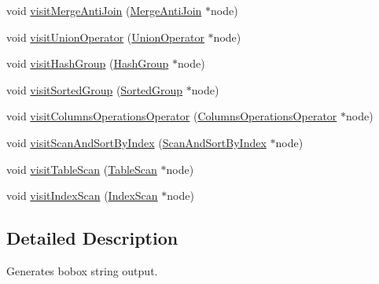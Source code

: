 \begin{DoxyCompactItemize}
\item 
void \hyperlink{class_bobox_plan_writing_physical_operator_visitor_a0346b44be20be9fb68d95029908808f6}{visit\+Merge\+Anti\+Join} (\hyperlink{class_merge_anti_join}{Merge\+Anti\+Join} $\ast$node)
\item 
void \hyperlink{class_bobox_plan_writing_physical_operator_visitor_a87c2ddbe5d05b7dcc30c9d61d540d1f5}{visit\+Union\+Operator} (\hyperlink{class_union_operator}{Union\+Operator} $\ast$node)
\item 
void \hyperlink{class_bobox_plan_writing_physical_operator_visitor_a1e114b9a6e5bf08a691a9197f03efe9d}{visit\+Hash\+Group} (\hyperlink{class_hash_group}{Hash\+Group} $\ast$node)
\item 
void \hyperlink{class_bobox_plan_writing_physical_operator_visitor_a78d8526758ffeb3b335b8fc4a8a2defb}{visit\+Sorted\+Group} (\hyperlink{class_sorted_group}{Sorted\+Group} $\ast$node)
\item 
void \hyperlink{class_bobox_plan_writing_physical_operator_visitor_afe09e3f584a43ff5e06947918cf16a46}{visit\+Columns\+Operations\+Operator} (\hyperlink{class_columns_operations_operator}{Columns\+Operations\+Operator} $\ast$node)
\item 
void \hyperlink{class_bobox_plan_writing_physical_operator_visitor_a09cbea340b85723f8e66e50b466d6e68}{visit\+Scan\+And\+Sort\+By\+Index} (\hyperlink{class_scan_and_sort_by_index}{Scan\+And\+Sort\+By\+Index} $\ast$node)
\item 
void \hyperlink{class_bobox_plan_writing_physical_operator_visitor_aa8d995c39b2364625c1c10b6d7636b23}{visit\+Table\+Scan} (\hyperlink{class_table_scan}{Table\+Scan} $\ast$node)
\item 
void \hyperlink{class_bobox_plan_writing_physical_operator_visitor_ae042371767ff5d9296468da8037efa0f}{visit\+Index\+Scan} (\hyperlink{class_index_scan}{Index\+Scan} $\ast$node)
\end{DoxyCompactItemize}


\subsection{Detailed Description}
Generates bobox string output. 

